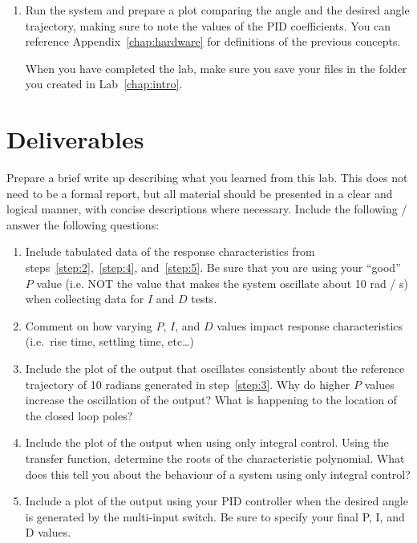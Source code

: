 \begin{enumerate}
    \item Run the system and prepare a plot comparing the angle and the desired angle
          trajectory, making sure to note the values of the PID coefficients. You can
          reference Appendix~\ref{chap:hardware} for definitions of the previous
          concepts.

          When you have completed the lab, make sure you save your files in the folder
          you created in Lab~\ref{chap:intro}\@.

\end{enumerate}

\section{Deliverables}

Prepare a brief write up describing what you learned from this lab. This does not
need to be a formal report, but all material should be presented in a clear and logical manner,
with concise descriptions where necessary. Include the following / answer the following questions:
\begin{enumerate}
    \item Include tabulated data of the response characteristics from steps~\ref{step:2},~\ref{step:4}, and~\ref{step:5}.
          Be sure that you are using your ``good'' \(P\) value (i.e. NOT the value that makes the system oscillate about 10 rad / s) when collecting data for \(I\) and \(D\) tests.
    \item Comment on how varying \(P\), \(I\), and \(D\) values impact response characteristics (i.e.\ rise time, settling time, etc\ldots)
    \item Include the plot of the output that oscillates consistently about the reference trajectory of 10 radians
          generated in step~\ref{step:3}. Why do higher \(P\) values increase the oscillation of the output? What is
          happening to the location of the closed loop poles?
    \item Include the plot of the output when using only integral control. Using the transfer function, determine the roots
          of the characteristic polynomial.  What does this tell you about the behaviour of a system using only integral control?
    \item Include a plot of the output using your PID controller when the desired angle is generated by the multi-input
          switch. Be sure to specify your final P, I, and D values.
\end{enumerate}

